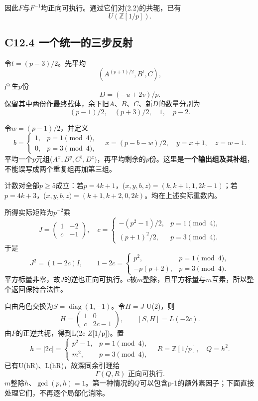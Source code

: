 {因此\ensuremath{F}与\ensuremath{F^{-1}}均正向可执行。通过它们对(2.2)的共轭，已有} \[
\boxed{U(\mathbb Z[1/p]).}
\tag{C12.3.3}
\]

\subsection*{\texorpdfstring{{C12.4} {一个统一的三步反射}}{C12.4 一个统一的三步反射}}\label{C12-h86}

{令\ensuremath{t=(p-3)/2}。先平均} \[
(A^{(p+1)/2},B^t,C),
\] {产生\ensuremath{p}份} \[
D=(-u+2v)/p.
\] {保留其中两份作最终载体，余下旧\ensuremath{A}、\ensuremath{B}、\ensuremath{C}、新\ensuremath{D}的数量分别为} \[
(p-1)/2,\quad(p+3)/2,\quad1,\quad p-2.
\]

{令\ensuremath{w=(p-1)/2}，并定义} \[
b=\begin{cases}1,&p=1\pmod4,\\0,&p=3\pmod4,\end{cases}
\quad
x=(p-b-w)/2,\quad y=x+1,\quad z=w-1.
\] {平均一个\ensuremath{p}元组(\ensuremath{A^{x},B^{y},C^{b},D^{z})}，再平均剩余的\ensuremath{p}份。这里是}\textbf{{一个输出组及其补组}}{，不能误写成两个重复组再加第三组。}

{计数对全部\ensuremath{p\ge 5}成立：若\ensuremath{p=4k+1}，(\ensuremath{x,y,b,z)=(k,k+1,1,2k-1)}；若\ensuremath{p=4k+3}，(\ensuremath{x,y,b,z)=(k+1,k+2,0,2k)}。均在上述实际重数内。}

{所得实际矩阵为\ensuremath{p^{-2}}乘} \[
J=\begin{pmatrix}1&-2\\c&-1\end{pmatrix},
\quad
c=\begin{cases}
-(p^2-1)/2,&p=1\pmod4,\\
(p+1)^2/2,&p=3\pmod4.
\end{cases}
\tag{C12.4.1}
\] {于是} \[
J^2=(1-2c)I,\qquad
1-2c=
\begin{cases}p^2,&p=1\pmod4,\\-p(p+2),&p=3\pmod4.\end{cases}
\] {平方标量非零，故\ensuremath{J}的逆也正向可执行。\ensuremath{c}被\ensuremath{m}整除，且平方标量与\ensuremath{m}互素，所以整个返回保持合法性。}

{自由角色交换为\ensuremath{S=\operatorname{diag}(1,-1)}。令\ensuremath{H=J}} {U(2)，则} \[
H=\begin{pmatrix}1&0\\c&2c-1\end{pmatrix},
\qquad
\boxed{[S,H]=L(-2c).}
\tag{C12.4.2}
\] {由\ensuremath{F}的正逆共轭，得到L(2c} {\ensuremath{Z}{[}1/p{]})。置} \[
h=|2c|=
\begin{cases}p^2-1,&p=1\pmod4,\\m^2,&p=3\pmod4,\end{cases}
\quad R=\mathbb Z[1/p],\quad Q=h^2.
\tag{C12.4.3}
\] {已有U(hR)、L(hR)，故深同余引理给} \[
\boxed{\Gamma(Q,R)\text{ 正向可执行}.}
\tag{C12.4.4}
\] {\ensuremath{m}整除\ensuremath{h}、\ensuremath{\operatorname{gcd}(p,h)=1}。第一种情况的\ensuremath{Q}可以包含p-1的额外素因子；下面直接处理它们，不再逐个局部化消除。}

